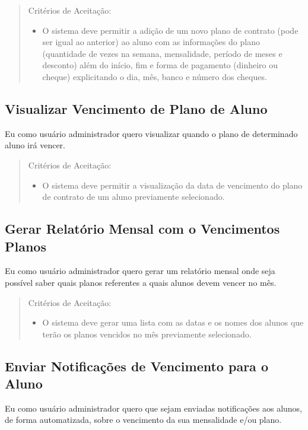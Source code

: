 \begin{quote}
Critérios de Aceitação:
    \begin{itemize}
        \item O sistema deve permitir a adição de um novo plano de contrato (pode ser igual ao anterior) ao aluno com as informações do plano (quantidade de vezes na semana, mensalidade, período de meses e desconto) além do início, fim e forma de pagamento (dinheiro ou cheque) explicitando o dia, mês, banco e número dos cheques.
    \end{itemize}
\end{quote}

\subsection[Visualizar Vencimento de Plano de Aluno]{Visualizar Vencimento de Plano de Aluno}
Eu como usuário administrador quero visualizar quando o plano de determinado
aluno irá vencer.

\begin{quote}
Critérios de Aceitação:
    \begin{itemize}
        \item O sistema deve permitir a visualização da data de vencimento do plano de contrato de um aluno previamente selecionado.
    \end{itemize}
\end{quote}

\subsection[Gerar Relatório Mensal com o Vencimentos Planos]{Gerar Relatório Mensal com o Vencimentos Planos}
Eu como usuário administrador quero gerar um relatório mensal onde seja possível
saber quais planos referentes a quais alunos devem vencer no mês.

\begin{quote}
Critérios de Aceitação:
    \begin{itemize}
        \item O sistema deve gerar uma lista com as datas e os nomes dos alunos que terão os planos vencidos no mês previamente selecionado.
    \end{itemize}
\end{quote}

\subsection[Enviar Notificações de Vencimento para o Aluno]{Enviar Notificações de Vencimento para o Aluno}
Eu como usuário administrador quero que sejam enviadas notificações aos alunos,
de forma automatizada, sobre o vencimento da sua mensalidade e/ou plano.

